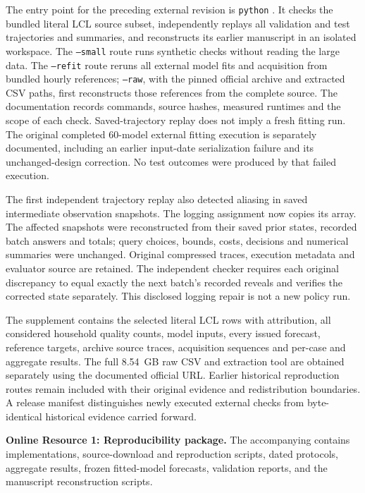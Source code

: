 \documentclass[12pt]{article}
\begin{document}
The entry point for the preceding external revision is
\texttt{python} . It checks the bundled
literal LCL source subset, independently replays all validation and test
trajectories and summaries, and reconstructs its earlier manuscript in an isolated
workspace. The \texttt{--small} route runs synthetic checks without reading
the large data. The \texttt{--refit} route reruns all external model fits and
acquisition from bundled hourly references; \texttt{--raw}, with the pinned
official archive and extracted CSV paths, first reconstructs those references
from the complete source. The documentation records commands, source hashes,
measured runtimes and the scope of each check. Saved-trajectory replay does
not imply a fresh fitting run. The original completed 60-model external
fitting execution is separately documented, including an earlier input-date
serialization failure and its unchanged-design correction. No test outcomes
were produced by that failed execution.

The first independent trajectory replay also detected aliasing in saved
intermediate observation snapshots. The logging assignment now copies its
array. The affected snapshots were reconstructed from their saved prior
states, recorded batch answers and totals; query choices, bounds, costs,
decisions and numerical summaries were unchanged. Original compressed
traces, execution metadata and evaluator source are retained. The independent
checker requires each original discrepancy to equal exactly the next
batch's recorded reveals and verifies the corrected state separately.
This disclosed logging repair is not a new policy run.

The supplement contains the selected literal LCL rows with attribution,
all considered household quality counts, model inputs, every issued forecast,
reference targets, archive source traces, acquisition sequences and per-case
and aggregate results. The full 8.54~GB raw CSV and extraction tool are
obtained separately using the documented official URL. Earlier historical
reproduction routes remain included with their original evidence and
redistribution boundaries. A release manifest distinguishes newly executed
external checks from byte-identical historical evidence carried forward.

\textbf{Online Resource 1: Reproducibility package.}
The accompanying  contains implementations,
source-download and reproduction scripts, dated protocols, aggregate
results, frozen fitted-model forecasts, validation reports, and the
manuscript reconstruction scripts.
\end{document}
